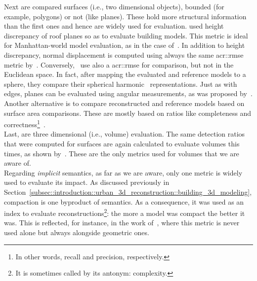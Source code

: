             Next are compared surfaces (i.e., two dimensional objects), bounded (for example, polygons) or not (like planes).
            These hold more structural information than the first ones and hence are widely used for evaluation.
            \textcite{rottensteiner2014results} used height discrepancy of roof planes so as to evaluate building models.
            This metric is ideal for Manhattan-world model evaluation, as in the case of~\textcite{zebedin2008fusion}.
            In addition to height discrepancy, normal displacement is computed using always the same \gls{acr::rmse} metric by~\textcite{henricsson19973}.
            Conversely,~\textcite{zeng2014multicriteria} use also a \gls{acr::rmse} for comparison, but not in the Euclidean space.
            In fact, after mapping the evaluated and reference models to a sphere, they compare their spherical harmonic~\parencite{brechbuhler1995parametrization} representations.
            Just as with edges, planes can be evaluated using angular measurements, as was proposed by~\textcite{henricsson19973,landes2012quality}.
            Another alternative is to compare reconstructed and reference models based on surface area comparisons.
            These are mostly based on ratios like completeness and correctness\footnote{In other words, recall and precision, respectively.}~\parencite{henricsson19973,schuster2003new,landes2012quality,rottensteiner2014results}.\\

            Last, are three dimensional (i.e., volume) evaluation.
            The same detection ratios that were computed for surfaces are again calculated to evaluate volumes this times, as shown by~\textcite{jaynes2003recognition,mohamed2013quality, zeng2014multicriteria,nguatem2017modeling}.
            These are the only metrics used for volumes that we are aware of.\\

            Regarding \textit{implicit} semantics, as far as we are aware, only one metric is widely used to evaluate its impact.
            As discussed previously in Section~\ref{subsec::introduction::urban_3d_reconstruction::building_3d_modeling}, compaction is one byproduct of semantics.
            As a consequence, it was used as an index to evaluate reconstructions\footnote{It is sometimes called by its antonym: complexity.}: the more a model was compact the better it was.
            This is reflected, for instance, in the work of~\textcite{lafarge2012creating,duan_eccv16,zhang2017deep,zeng2018neural,zhu2018large}, where this metric is never used alone but always alongside geometric ones.

